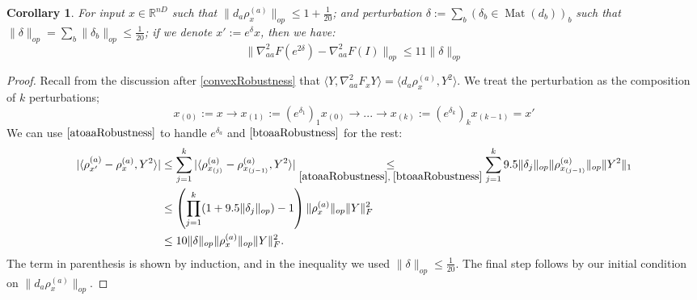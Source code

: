 \documentclass{article}
\newtheorem{corollary}[theorem]{Corollary}
\newcommand{\R}{{\mathbb{R}}}
\newcommand{\mat}{\operatorname{Mat}}
\newcommand\samp{x}
\newcommand{\CF}[1]{{\color{purple}[CF: #1]}}
\begin{document}
\begin{corollary} \label{diagRobustness}
For input $\samp \in \R^{nD}$ such that $\|d_{a} \rho_{\samp}^{(a)}\|_{op} \leq 1 + \frac{1}{20}$; and perturbation $\delta := \sum_{b} (\delta_{b} \in \mat(d_{b}))_{b}$ such that $\|\delta\|_{op} = \sum_{b} \|\delta_{b}\|_{op} \leq \frac{1}{20}$; if we denote $\samp' := e^{\delta} \samp$, then we have:
\[ \|\nabla^{2}_{aa} F(e^{2\delta}) - \nabla^{2}_{aa} F(I)\|_{op} \leq 11 \|\delta\|_{op}     \]
\end{corollary}
\begin{proof}
Recall from the discussion after \ref{convexRobustness} that $\langle Y, \nabla^{2}_{aa} F_{\samp} Y \rangle = \langle d_{a} \rho_{\samp}^{(a)}, Y^{2} \rangle$. We treat the perturbation as the composition of $k$ perturbations; 
\[ \samp_{(0)}:=\samp \to \samp_{(1)}:= (e^{\delta_{1}})_1 \samp_{(0)} \to ... \to \samp_{(k)}:=(e^{\delta_{k}})_{k} \samp_{(k-1)} = \samp'  \]
We can use $\ref{atoaaRobustness}$ to handle $e^{\delta_{a}}$ and $\ref{btoaaRobustness}$ for the rest:
\begin{align*}
 |\langle \rho_{\samp'}^{(a)} - \rho_{\samp}^{(a)}, Y^{2} \rangle| 
 &\leq \sum_{j=1}^{k} |\langle \rho_{\samp_{(j)}}^{(a)} - \rho_{\samp_{(j-1)}}^{(a)}, Y^{2} \rangle| \underset{\ref{atoaaRobustness},\;\ref{btoaaRobustness}}{\leq} \sum_{j=1}^{k}  9.5 \|\delta_{j}\|_{op} \|\rho_{\samp_{(j-1)}}^{(a)}\|_{op} \|Y^{2}\|_{1} \\
& \leq \left( \prod_{j=1}^k (1+9.5 \|\delta_{j}\|_{op}) - 1 \right) \|\rho_{\samp}^{(a)}\|_{op} \|Y\|_{F}^{2} \\
&\leq 10 \|\delta\|_{op} \|\rho_{\samp}^{(a)}\|_{op} \|Y\|_{F}^{2}.   \end{align*}
The term in parenthesis is shown by induction, and in the inequality we used $\|\delta\|_{op} \leq \frac{1}{20}$. The final step follows by our initial condition on $\|d_{a} \rho_{\samp}^{(a)}\|_{op}$. 
\end{proof}
\end{document}
